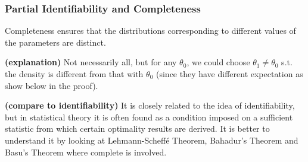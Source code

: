 \documentclass{article}
\newcommand{\bfs}[1]{\textbf{({#1}) }}
\begin{document}
\subsubsection{Partial Identifiability and Completeness}

\begin{lema}\label{lem:gfda}
Completeness ensures that the distributions corresponding to  different values of the parameters are distinct.
\end{lema}
\begin{rema}\bfs{explanation}
 Not necessarily all, but for any $\theta_0$, we could choose $\theta_1\ne\theta_0$ s.t. the density is different from that with $\theta_0$ (since they have different expectation as show below in the proof). 
\end{rema}
\begin{rema}\bfs{compare to identifiability}
It is closely related to the idea of identifiability, but in statistical theory it is often found as a condition imposed on a sufficient statistic from which certain optimality results are derived.  It is better to understand it by looking at Lehmann-Scheff\'e Theorem, Bahadur's Theorem and Basu's Theorem where complete is involved.
\end{rema}
\end{document}

